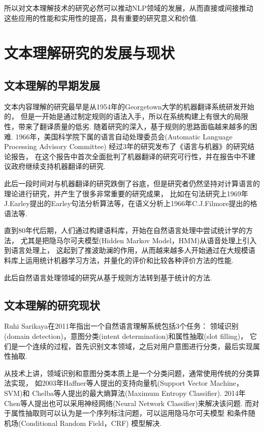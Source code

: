 \documentclass[bachelor,adobefonts]{jnuthesis}
\begin{document}
所以对文本理解技术的研究必然可以推动NLP领域的发展，从而直接或间接推动这些应用的性能和实用性的提高，具有重要的研究意义和价值.

\section{文本理解研究的发展与现状}
\subsection{文本理解的早期发展}
文本内容理解的研究最早是从1954年的Georgetown大学的机器翻译系统\cite{SlocumMachine}研发开始的，
但是一开始是通过制定规则的语法入手，所以在系统构建上有很大的局限性，带来了翻译质量的低劣.
随着研究的深入，基于规则的思路面临越来越多的困难.
1966年，美国科学院下属的语言自动处理委员会(Automatic Language Processing Advisory Committee)
经过3年的研究发布了《语言与机器》的研究结论报告\cite{Pardelli2008From}，
在这个报告中首次全面批判了机器翻译的研究可行性，并在报告中不建议政府继续支持机器翻译的研究.

此后一段时间对与机器翻译的研究跌倒了谷底，但是研究者仍然坚持对计算语言的理论进行研究，并产生了很多非常重要的研究成果，
比如在句法研究上1969年J.Earley提出的Earley句法分析算法\cite{Earley1970An}等，在语义分析上1966年C.J.Filmore提出的格语法等.


直到80年代后期，人们通过构建语料库，开始在自然语言处理中尝试统计学的方法，
尤其是把隐马尔可夫模型(Hidden Markov Model，HMM)从语音处理上引入到语言处理上，
这起到了推波助澜的作用，从而越来越多人开始通过在大规模语料库上运用统计机器学习方法，并量化的评价和比较各种评价方法的性能.


此后自然语言处理领域的研究从基于规则方法转到基于统计的方法.

\subsection{文本理解的研究现状}
Ruhi Sarikaya在2011年指出一个自然语言理解系统包括3个任务：
领域识别(domain detection)，意图分类(intent determination)和属性抽取(slot filling)\cite{Tur2011Spoken}，
它们是一个连续的过程，首先识别文本领域，之后对用户意图进行分类，最后实现属性抽取.


从技术上讲，领域识别和意图分类本质上是一个分类问题，通常使用传统的分类算法实现，
如2003年Haffner等人\cite{Haffner2003Optimizing,Chelba2003Speech,Chen2015Deriving}提出的支持向量机(Support Vector Machine，SVM)和
Chelba等人\cite{Chen2011Maximum}提出的最大熵算法(Maximum Entropy Classifier).
2014年Chen等人\cite{Ravuri2015Recurrent}提出也可以采用神经网络(Neural Network Classifier)来解决该问题.
而对于属性抽取则可以认为是一个序列标注问题，可以运用隐马尔可夫模型
和条件随机场(Conditional Random Field，CRF) 模型\cite{Pieraccini1992A,Wang2005Spoken}解决.
\end{document}
